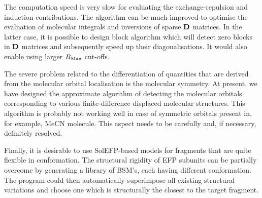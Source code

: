 \documentclass[b5paper,oneside,fleqn,11pt]{book}
\begin{document}
\begin{refsection}
The computation speed is very slow for evaluating the exchange\hyp{}repulsion and induction
contributions. The algorithm can be much improved to optimise the
evaluation of molecular integrals and inversions of sparse $\bf D$ matrices.
In the latter case, it is possible to design block algorithm which
will detect zero blocks in $\bf D$ matrices and subsequently speed up their
diagonalisations. It would also enable using larger $R_{\rm Max}$ cut\hyp{}offs.

The severe problem related to the differentiation of quantities that are
derived from the molecular orbital localisation is the molecular symmetry.
At present, we have designed the approximate algorithm of detecting the
molecular orbitals corresponding to various finite\hyp{}difference displaced
molecular structures. This algorithm is probably not working well in case of
symmetric orbitals present in, for example, MeCN molecule. This aspect needs 
to be carefully and, if necessary, definitely resolved.

Finally, it is desirable to use SolEFP\hyp{}based models for fragments
that are quite flexible in conformation. The structural rigidity of EFP
subunits can be partially overcome by generating a library of BSM's,
each having different conformation. The program could then automatically superimpose
all existing structural variations and choose one which is structurally the closest
to the target fragment.



\printbibliography[heading=subbibintoc,title={References}]
\end{refsection}

\end{document}
